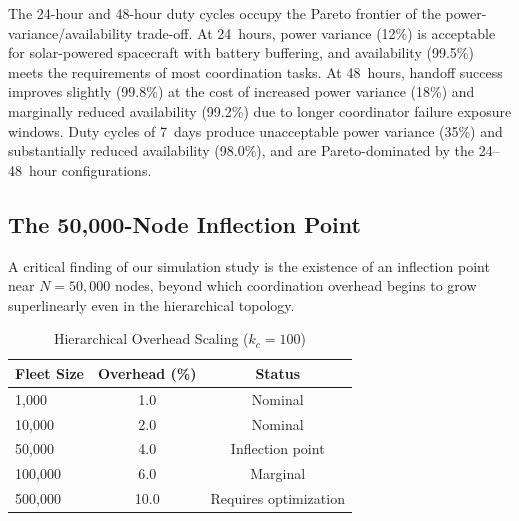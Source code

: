 \documentclass[journal]{IEEEtran}
\begin{document}
The 24-hour and 48-hour duty cycles occupy the Pareto frontier of the power-variance/availability trade-off. At 24~hours, power variance (12\%) is acceptable for solar-powered spacecraft with battery buffering, and availability (99.5\%) meets the requirements of most coordination tasks. At 48~hours, handoff success improves slightly (99.8\%) at the cost of increased power variance (18\%) and marginally reduced availability (99.2\%) due to longer coordinator failure exposure windows. Duty cycles of 7~days produce unacceptable power variance (35\%) and substantially reduced availability (98.0\%), and are Pareto-dominated by the 24--48~hour configurations.

\subsection{The 50{,}000-Node Inflection Point}

A critical finding of our simulation study is the existence of an inflection point near $N = 50{,}000$ nodes, beyond which coordination overhead begins to grow superlinearly even in the hierarchical topology.

\begin{table}[t]
    \centering
    \caption{Hierarchical Overhead Scaling ($k_c = 100$)}
    \label{tab:inflection}
    \begin{tabular}{@{}lcc@{}}
        \toprule
        \textbf{Fleet Size} & \textbf{Overhead (\%)} & \textbf{Status} \\
        \midrule
        1{,}000    & 1.0 & Nominal \\
        10{,}000   & 2.0 & Nominal \\
        50{,}000   & 4.0 & Inflection point \\
        100{,}000  & 6.0 & Marginal \\
        500{,}000  & 10.0 & Requires optimization \\
        \bottomrule
    \end{tabular}
\end{table}

\end{document}
